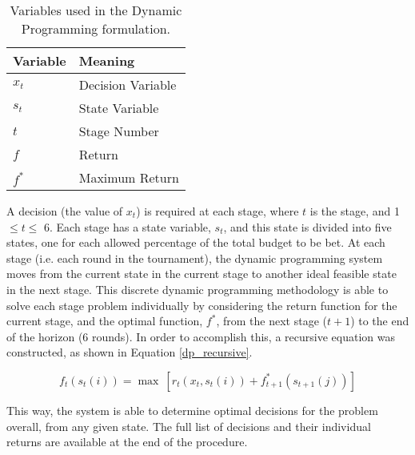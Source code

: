 \documentclass[12pt]{article}
\begin{document}
\begin{table}[htbp!]
\begin{centering}
    \begin{tabular}{|l|l|}
    \hline
    Variable & Meaning           \\ \hline
    $x_{t}$        & Decision Variable \\ \hline
    $s_{t}$        & State Variable    \\ \hline
    $t$        & Stage Number             \\ \hline
    $f$        & Return            \\ \hline
    $f^{*}$       & Maximum Return    \\ \hline
    \end{tabular}
    \label{dp_vars}
    \caption{Variables used in the Dynamic Programming formulation.}
\end{centering}
\end{table}

A decision (the value of $x_{t}$) is required at each stage, where $t$ is the stage, and 1 $\le t \le$ 6.
Each stage has a state variable, $s_{t}$, and this state is divided into five states, one for each allowed percentage of the total budget to be bet.
At each stage (i.e. each round in the tournament), the dynamic programming system moves from the current state in the current stage to another ideal feasible state in the next stage.
This discrete dynamic programming methodology is able to solve each stage problem individually by considering the return function for the current stage, and the optimal function, $f^{*}$, from the next stage ($t + 1$) to the end of the horizon (6 rounds).
In order to accomplish this, a recursive equation was constructed, as shown in Equation \ref{dp_recursive}.

\begin{equation}
f_{t}(s_{t}(i)) = \max \ [r_{t}(x_{t},s_{t}(i)) + f^{*}_{t+1}(s_{t+1}(j))]
\label{dp_recursive}
\end{equation}

This way, the system is able to determine optimal decisions for the problem overall, from any given state.
The full list of decisions and their individual returns are available at the end of the procedure.
\end{document}
